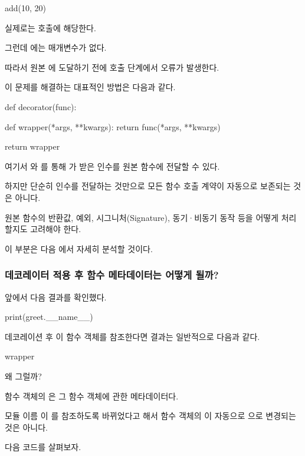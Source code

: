 \begin{dhkcode}
add(10, 20)
\end{dhkcode}

실제로는  호출에 해당한다.

그런데 에는 매개변수가 없다.

따라서 원본 에 도달하기 전에  호출 단계에서 오류가 발생한다.

이 문제를 해결하는 대표적인 방법은 다음과 같다.

\begin{dhkcode}
def decorator(func):

    def wrapper(*args, **kwargs):
        return func(*args, **kwargs)

    return wrapper
\end{dhkcode}

여기서 와 를 통해 가 받은 인수를 원본 함수에 전달할 수 있다.

하지만 단순히 인수를 전달하는 것만으로 모든 함수 호출 계약이 자동으로 보존되는 것은 아니다.

원본 함수의 반환값, 예외, 시그니처(Signature), 동기·비동기 동작 등을 어떻게 처리할지도 고려해야 한다.

이 부분은 다음 에서 자세히 분석할 것이다.

\subsubsection{데코레이터 적용 후 함수 메타데이터는 어떻게 될까?}

앞에서 다음 결과를 확인했다.

\begin{dhkcode}
print(greet.__name__)
\end{dhkcode}

데코레이션 후 이  함수 객체를 참조한다면 결과는 일반적으로 다음과 같다.

\begin{dhkzsh}
wrapper
\end{dhkzsh}

왜 그럴까?

함수 객체의 은 그 함수 객체에 관한 메타데이터다.

모듈 이름 이 를 참조하도록 바뀌었다고 해서 함수 객체의 이 자동으로 으로 변경되는 것은 아니다.

다음 코드를 살펴보자.

